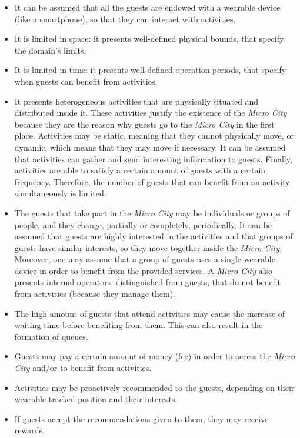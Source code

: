 \begin{itemize}
    \item It can be assumed that all the guests are endowed with a wearable device (like a smartphone), so that they can interact with activities.
    \item It is limited in space: it presents well-defined physical bounds, that specify the domain's limits.
    \item It is limited in time: it presents well-defined operation periods, that specify when guests can benefit from activities.
    \item It presents heterogeneous activities that are physically situated and distributed inside it.
    These activities justify the existence of the \textit{Micro City} because they are the reason why guests go to the \textit{Micro City} in the first place.
    Activities may be static, meaning that they cannot physically move, or dynamic, which means that they may move if necessary.
    It can be assumed that activities can gather and send interesting information to guests.
    Finally, activities are able to satisfy a certain amount of guests with a certain frequency.
    Therefore, the number of guests that can benefit from an activity simultaneously is limited.
    \item The guests that take part in the \textit{Micro City} may be individuals or groups of people, and they change, partially or completely, periodically.
    It can be assumed that guests are highly interested in the activities and that groups of guests have similar interests, so they move together inside the \textit{Micro City}.
    Moreover, one may assume that a group of guests uses a single wearable device in order to benefit from the provided services.
    A \textit{Micro City} also presents internal operators, distinguished from guests, that do not benefit from activities (because they manage them).
    \item The high amount of guests that attend activities may cause the increase of waiting time before benefiting from them.
    This can also result in the formation of queues.
    \item Guests may pay a certain amount of money (fee) in order to access the \textit{Micro City} and/or to benefit from activities.
    \item Activities may be proactively recommended to the guests, depending on their wearable-tracked position and their interests.
    \item If guests accept the recommendations given to them, they may receive rewards.

\end{itemize}
